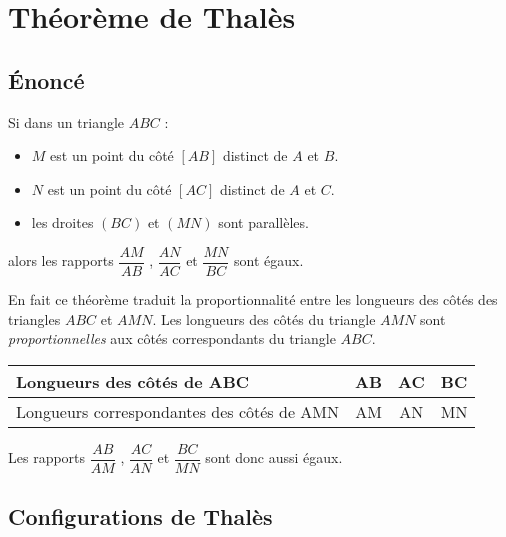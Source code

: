 \section{Théorème de Thalès}
    \subsection{Énoncé}
        \begin{theoreme}[\admis]
            Si dans un triangle $ABC$ :
            \begin{itemize}                
                \item $M$ est un point du côté $[AB]$ distinct de $A$ et $B$.
                \item $N$ est un point du côté $[AC]$ distinct de $A$ et $C$.
                \item les droites $(BC)$ et $(MN)$ sont parallèles.       
            \end{itemize}
            \medskip
            alors les rapports $\dfrac{AM}{AB}$ , $\dfrac{AN}{AC}$ et $\dfrac{MN}{BC}$ sont égaux.
        \end{theoreme}

        \begin{remarque}
            En fait ce théorème traduit la proportionnalité entre les longueurs des côtés des triangles $ABC$ et $AMN$.
            Les longueurs des côtés du triangle $AMN$ sont {\em proportionnelles} aux côtés correspondants du triangle $ABC$.

            \medskip
            \begin{tabular}{|p{7cm}|c|c|c|}
            \hline 
            Longueurs des côtés de ABC & AB & AC & BC \\ 
            \hline 
            Longueurs correspondantes des côtés de AMN & AM & AN & MN \\ 
            \hline 
            \end{tabular} 

            \medskip
            Les rapports $\dfrac{AB}{AM}$ , $\dfrac{AC}{AN}$ et $\dfrac{BC}{MN}$ sont donc aussi égaux.
        \end{remarque}
    
    \subsection{Configurations de Thalès}
         \color{black}{\dashuline{\color{black}{Les droites en pointillés noirs sont parallèles.}}}
        \color{black}


